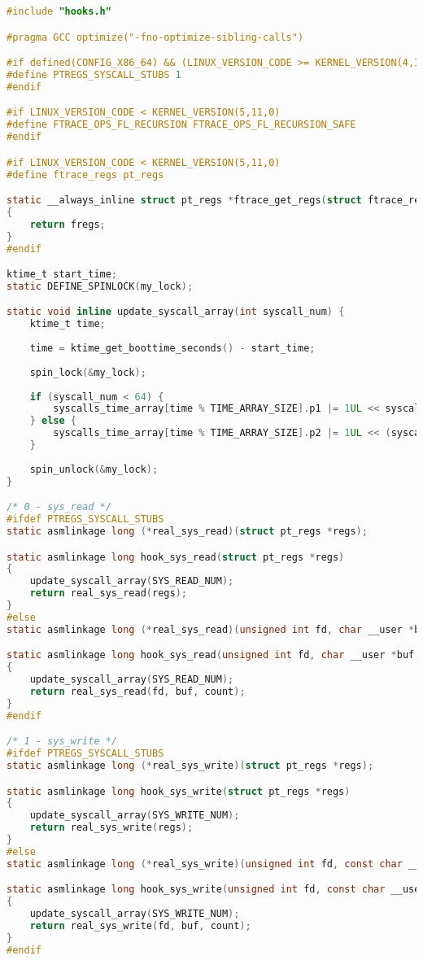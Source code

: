 \begin{lstlisting}[label=lst:log, caption=Листинг файла hooks.c, language=c]
#include "hooks.h"

#pragma GCC optimize("-fno-optimize-sibling-calls")

#if defined(CONFIG_X86_64) && (LINUX_VERSION_CODE >= KERNEL_VERSION(4,17,0))
#define PTREGS_SYSCALL_STUBS 1
#endif

#if LINUX_VERSION_CODE < KERNEL_VERSION(5,11,0)
#define FTRACE_OPS_FL_RECURSION FTRACE_OPS_FL_RECURSION_SAFE
#endif

#if LINUX_VERSION_CODE < KERNEL_VERSION(5,11,0)
#define ftrace_regs pt_regs

static __always_inline struct pt_regs *ftrace_get_regs(struct ftrace_regs *fregs)
{
	return fregs;
}
#endif

ktime_t start_time;
static DEFINE_SPINLOCK(my_lock);

static void inline update_syscall_array(int syscall_num) {
	ktime_t time;
	
	time = ktime_get_boottime_seconds() - start_time;
	
	spin_lock(&my_lock);
	
	if (syscall_num < 64) {
		syscalls_time_array[time % TIME_ARRAY_SIZE].p1 |= 1UL << syscall_num;
	} else {
		syscalls_time_array[time % TIME_ARRAY_SIZE].p2 |= 1UL << (syscall_num % 64);
	}
	
	spin_unlock(&my_lock);
}

/* 0 - sys_read */
#ifdef PTREGS_SYSCALL_STUBS
static asmlinkage long (*real_sys_read)(struct pt_regs *regs);

static asmlinkage long hook_sys_read(struct pt_regs *regs)
{
	update_syscall_array(SYS_READ_NUM);
	return real_sys_read(regs);
}
#else
static asmlinkage long (*real_sys_read)(unsigned int fd, char __user *buf, size_t count);

static asmlinkage long hook_sys_read(unsigned int fd, char __user *buf, size_t count)
{
	update_syscall_array(SYS_READ_NUM);
	return real_sys_read(fd, buf, count);
}
#endif

/* 1 - sys_write */
#ifdef PTREGS_SYSCALL_STUBS
static asmlinkage long (*real_sys_write)(struct pt_regs *regs);

static asmlinkage long hook_sys_write(struct pt_regs *regs)
{
	update_syscall_array(SYS_WRITE_NUM);
	return real_sys_write(regs);
}
#else
static asmlinkage long (*real_sys_write)(unsigned int fd, const char __user *buf, size_t count);

static asmlinkage long hook_sys_write(unsigned int fd, const char __user *buf, size_t count)
{
	update_syscall_array(SYS_WRITE_NUM);
	return real_sys_write(fd, buf, count);
}
#endif


\end{lstlisting}
